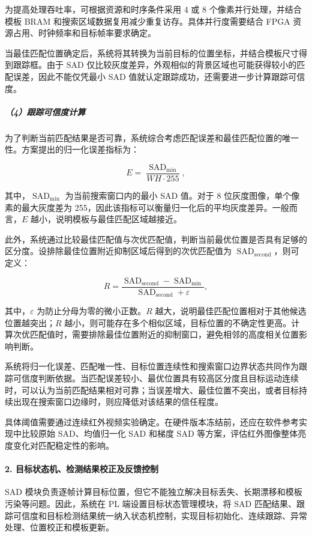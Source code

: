 \documentclass[UTF8,a4paper,12pt,fontset=windows]{ctexart}
\begin{document}
为提高处理吞吐率，可根据资源和时序条件采用 4 或 8 个像素并行处理，并结合模板 BRAM 和搜索区域数据复用减少重复访存。具体并行度需要结合 FPGA 资源占用、时钟频率和目标帧率要求确定。

当最佳匹配位置确定后，系统将其转换为当前目标的位置坐标，并结合模板尺寸得到跟踪框。由于 SAD 仅比较灰度差异，外观相似的背景区域也可能获得较小的匹配误差，因此不能仅凭最小 SAD 值就认定跟踪成功，还需要进一步计算跟踪可信度。

\subparagraph*{（4）跟踪可信度计算}
为了判断当前匹配结果是否可靠，系统综合考虑匹配误差和最佳匹配位置的唯一性。方案提出的归一化误差指标为：

\[
E=\frac{\operatorname{SAD}_{\min}}{W H\cdot255},
\]

其中，\(\operatorname{SAD}_{\min}\) 为当前搜索窗口内的最小 SAD 值。对于 8 位灰度图像，单个像素的最大灰度差为 255，因此该指标可以衡量归一化后的平均灰度差异。一般而言，\(E\) 越小，说明模板与最佳匹配区域越接近。

此外，系统通过比较最佳匹配值与次优匹配值，判断当前最优位置是否具有足够的区分度。设排除最佳位置附近抑制区域后得到的次优匹配值为 \(\operatorname{SAD}_{\mathrm{second}}\)，则可定义：

\[
R=
\frac{\operatorname{SAD}_{\mathrm{second}}-
\operatorname{SAD}_{\min}}
{\operatorname{SAD}_{\mathrm{second}}+\varepsilon},
\]

其中，\(\varepsilon\) 为防止分母为零的微小正数。\(R\) 越大，说明最佳匹配位置相对于其他候选位置越突出；\(R\) 越小，则可能存在多个相似区域，目标位置的不确定性更高。计算次优匹配值时，需要排除最佳位置附近的抑制窗口，避免相邻的高度相关位置影响判断。

系统将归一化误差、匹配唯一性、目标位置连续性和搜索窗口边界状态共同作为跟踪可信度判断依据。当匹配误差较小、最优位置具有较高区分度且目标运动连续时，可以认为当前匹配结果相对可靠；当误差增大、最佳位置不突出，或者目标持续出现在搜索窗口边缘时，则应降低对该结果的信任程度。

具体阈值需要通过连续红外视频实验确定。在硬件版本冻结前，还应在软件参考实现中比较原始 SAD、均值归一化 SAD 和梯度 SAD 等方案，评估红外图像整体亮度变化对匹配稳定性的影响。

\paragraph*{2. 目标状态机、检测结果校正及反馈控制}
SAD 模块负责逐帧计算目标位置，但它不能独立解决目标丢失、长期漂移和模板污染等问题。因此，系统在 PL 端设置目标状态管理模块，将 SAD 匹配结果、跟踪可信度和目标检测结果统一纳入状态机控制，实现目标初始化、连续跟踪、异常处理、位置校正和模板更新。
\end{document}
